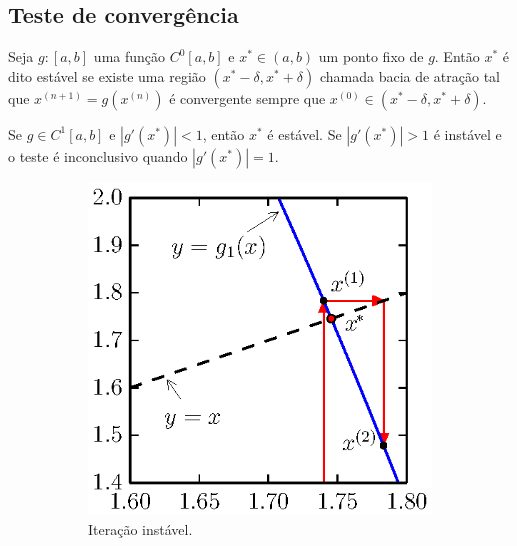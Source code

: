 \subsection{Teste de convergência}
Seja $g :[a,b]$ uma função $C^0[a,b]$ e $x^*\in(a,b)$ um ponto fixo de $g$. Então $x^*$ é dito estável se existe uma região $(x^*-\delta,x^*+\delta)$ chamada bacia de atração tal que $x^{(n+1)}=g(x^{(n)})$ é convergente sempre que $x^{(0)}\in(x^*-\delta,x^*+\delta)$.

\begin{prop}
 Se $g\in C^1[a,b]$ e  $|g'(x^*)|<1$, então $x^*$ é estável. Se $|g'(x^*)|>1$ é instável e o teste é inconclusivo quando $|g'(x^*)|=1$.
\end{prop}

\begin{figure}[h]
    \centering
    \begin{subfigure}[b]{0.45\textwidth}
        \includegraphics{./cap_equacao1d/pics/ponto_fixo_instavel/ponto_fixo_instavel.eps}
        \caption{Iteração instável.}
        \label{fig:ponto_fixo_instavel}
    \end{subfigure}
    \begin{subfigure}[b]{0.45\textwidth}

\end{subfigure}
\end{figure}
